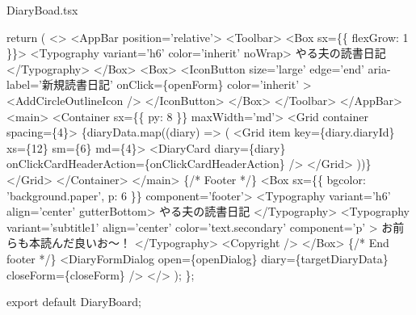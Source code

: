 \begin{starterprogram}[]{DiaryBoad.tsx}
{    return (
      \textless{}\textgreater{}
        \textless{}AppBar position='relative'\textgreater{}
          \textless{}Toolbar\textgreater{}
            \textless{}Box sx=\{\{ flexGrow: 1 \}\}\textgreater{}
              \textless{}Typography variant='h6' color='inherit' noWrap\textgreater{}
                やる夫の読書日記
              \textless{}/Typography\textgreater{}
            \textless{}/Box\textgreater{}
            \textless{}Box\textgreater{}
              \textless{}IconButton
                size='large'
                edge='end'
                aria{-}label='新規読書日記'
                onClick=\{openForm\}
                color='inherit'
              \textgreater{}
                \textless{}AddCircleOutlineIcon /\textgreater{}
              \textless{}/IconButton\textgreater{}
            \textless{}/Box\textgreater{}
          \textless{}/Toolbar\textgreater{}
        \textless{}/AppBar\textgreater{}
        \textless{}main\textgreater{}
          \textless{}Container sx=\{\{ py: 8 \}\} maxWidth='md'\textgreater{}
            \textless{}Grid container spacing=\{4\}\textgreater{}
              \{diaryData.map((diary) =\textgreater{} (
                \textless{}Grid item key=\{diary.diaryId\} xs=\{12\} sm=\{6\} md=\{4\}\textgreater{}
                  \textless{}DiaryCard
                    diary=\{diary\}
                    onClickCardHeaderAction=\{onClickCardHeaderAction\}
                  /\textgreater{}
                \textless{}/Grid\textgreater{}
              ))\}
            \textless{}/Grid\textgreater{}
          \textless{}/Container\textgreater{}
        \textless{}/main\textgreater{}
        \{/* Footer */\}
        \textless{}Box sx=\{\{ bgcolor: 'background.paper', p: 6 \}\} component='footer'\textgreater{}
          \textless{}Typography variant='h6' align='center' gutterBottom\textgreater{}
            やる夫の読書日記
          \textless{}/Typography\textgreater{}
          \textless{}Typography
            variant='subtitle1'
            align='center'
            color='text.secondary'
            component='p'
          \textgreater{}
            お前らも本読んだ良いお〜！
          \textless{}/Typography\textgreater{}
          \textless{}Copyright /\textgreater{}
        \textless{}/Box\textgreater{}
        \{/* End footer */\}
        \textless{}DiaryFormDialog
          open=\{openDialog\}
          diary=\{targetDiaryData\}
          closeForm=\{closeForm\}
        /\textgreater{}
      \textless{}/\textgreater{}
    );
  \};

  export default DiaryBoard;
}\end{starterprogram}


